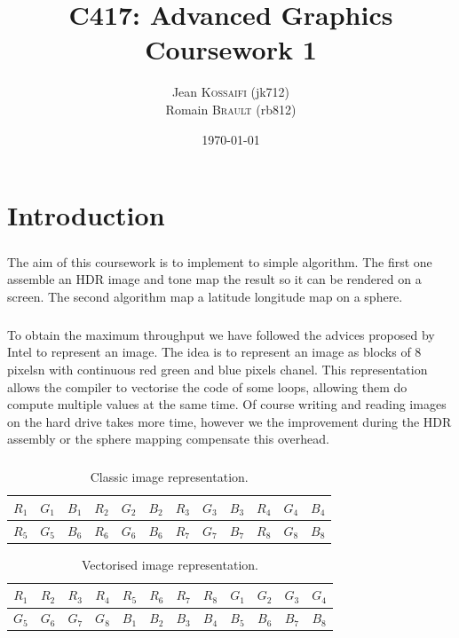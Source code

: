 \documentclass[a4paper,12pt,oneside,final]{report}
\author{
	Jean \textsc{Kossaifi} (jk712)\\
    Romain \textsc{Brault} (rb812)\\
}
\title{\Huge C417: Advanced Graphics \\ Coursework 1}
\date{\today}
\begin{document}
\maketitle
\tableofcontents

\chapter{Introduction}
\paragraph{}
The aim of this coursework is to implement to simple algorithm. The first one assemble an HDR image and tone map the result so it can be rendered on a screen. The second algorithm map a latitude longitude map on a sphere.
\paragraph{}
To obtain the maximum throughput we have followed the advices proposed by Intel \cite{Petter2009intel} to represent an image. The idea is to represent an image as blocks of 8 pixelsn with continuous red green and blue pixels chanel. This representation allows the compiler to vectorise the code of some loops, allowing them do compute multiple values at the same time. Of course writing and reading images on the hard drive takes more time, however we the improvement during the HDR assembly or the sphere mapping compensate this overhead.
\paragraph{}
\begin{table}[htbp]
\centering
\begin{tabular}{|c|c|c|c|c|c|c|c|c|c|c|c|}
\hline
$R_1$ & $G_1$ & $B_1$ & $R_2$ & $G_2$ & $B_2$ & $R_3$ & $G_3$ & $B_3$ & $R_4$ & $G_4$ & $B_4$ \\ \hline
$R_5$ & $G_5$ & $B_6$ & $R_6$ & $G_6$ & $B_6$ & $R_7$ & $G_7$ & $B_7$ & $R_8$ & $G_8$ & $B_8$ \\
\hline
\end{tabular}
\caption{Classic image representation.}
\end{table}
\begin{table}[htbp]
\centering
\begin{tabular}{|c|c|c|c|c|c|c|c|c|c|c|c|}
\hline
$R_1$ & $R_2$ & $R_3$ & $R_4$ & $R_5$ & $R_6$ & $R_7$ & $R_8$ & $G_1$ & $G_2$ & $G_3$ & $G_4$ \\ \hline
$G_5$ & $G_6$ & $G_7$ & $G_8$ & $B_1$ & $B_2$ & $B_3$ & $B_4$ & $B_5$ & $B_6$ & $B_7$ & $B_8$ \\
\hline
\end{tabular}
\caption{Vectorised image representation.}
\end{table}
\end{document}
